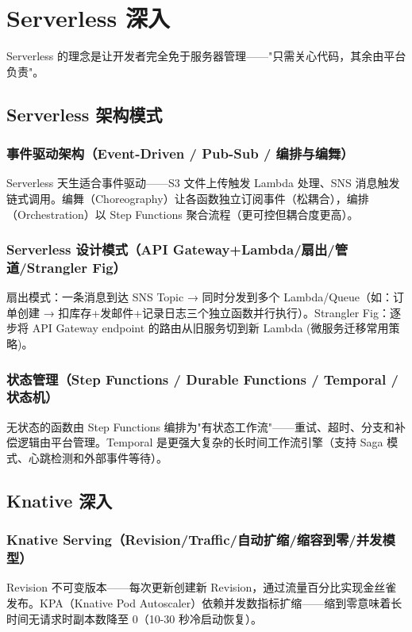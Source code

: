 \documentclass[12pt,UTF8]{ctexbook}
\begin{document}
\chapter{Serverless 深入}
\label{chap:serverless-deep}

Serverless 的理念是让开发者完全免于服务器管理——"只需关心代码，其余由平台负责"。

  \section{Serverless 架构模式}
    \subsection{事件驱动架构（Event-Driven / Pub-Sub / 编排与编舞）}

Serverless 天生适合事件驱动——S3 文件上传触发 Lambda 处理、SNS 消息触发链式调用。编舞（Choreography）让各函数独立订阅事件（松耦合），编排（Orchestration）以 Step Functions 聚合流程（更可控但耦合度更高）。

    \subsection{Serverless 设计模式（API Gateway+Lambda/扇出/管道/Strangler Fig）}

扇出模式：一条消息到达 SNS Topic → 同时分发到多个 Lambda/Queue（如：订单创建 → 扣库存+发邮件+记录日志三个独立函数并行执行）。Strangler Fig：逐步将 API Gateway endpoint 的路由从旧服务切到新 Lambda (微服务迁移常用策略)。

    \subsection{状态管理（Step Functions / Durable Functions / Temporal / 状态机）}

无状态的函数由 Step Functions 编排为"有状态工作流"——重试、超时、分支和补偿逻辑由平台管理。Temporal 是更强大复杂的长时间工作流引擎（支持 Saga 模式、心跳检测和外部事件等待）。

  \section{Knative 深入}
    \subsection{Knative Serving（Revision/Traffic/自动扩缩/缩容到零/并发模型）}

Revision 不可变版本——每次更新创建新 Revision，通过流量百分比实现金丝雀发布。KPA（Knative Pod Autoscaler）依赖并发数指标扩缩——缩到零意味着长时间无请求时副本数降至 0（10-30 秒冷启动恢复）。
\end{document}
